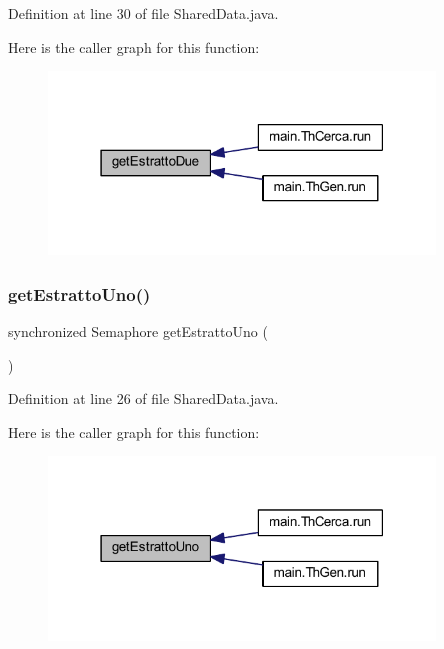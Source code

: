 Definition at line 30 of file Shared\+Data.\+java.

Here is the caller graph for this function\+:
\nopagebreak
\begin{figure}[H]
\begin{center}
\leavevmode
\includegraphics[width=291pt]{classmain_1_1_shared_data_a03babbf5685e678be2baebb70af3fc4e_icgraph}
\end{center}
\end{figure}
\mbox{\label{classmain_1_1_shared_data_a113b8bd4e0520f7610c30c826d177898}} 
\subsubsection{\texorpdfstring{get\+Estratto\+Uno()}{getEstrattoUno()}}
{\footnotesize\ttfamily synchronized Semaphore get\+Estratto\+Uno (\begin{DoxyParamCaption}{ }\end{DoxyParamCaption})}



Definition at line 26 of file Shared\+Data.\+java.

Here is the caller graph for this function\+:
\nopagebreak
\begin{figure}[H]
\begin{center}
\leavevmode
\includegraphics[width=291pt]{classmain_1_1_shared_data_a113b8bd4e0520f7610c30c826d177898_icgraph}
\end{center}
\end{figure}
\mbox{\label{classmain_1_1_shared_data_ab9a75de14be42bfeb3654d44f09b20bf}} 
